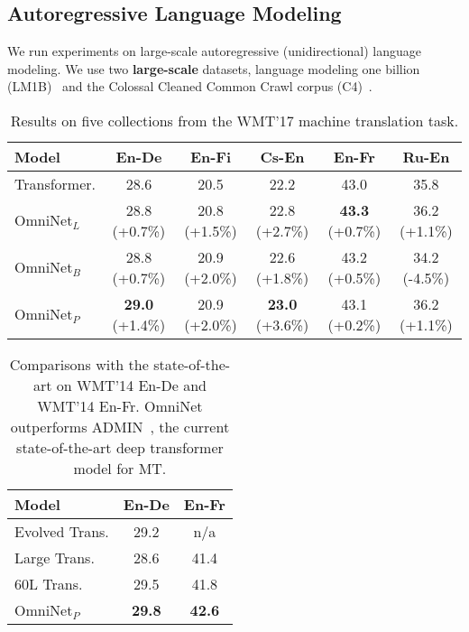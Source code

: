 \documentclass{article}
\begin{document}
\subsection{Autoregressive Language Modeling}
We run experiments on large-scale autoregressive (unidirectional) language modeling. We use two \textbf{large-scale} datasets, language modeling one billion (LM1B)~\citep{chelba2013one} and the Colossal Cleaned Common Crawl corpus (C4)~\citep{raffel2019exploring}. 

\begin{table*}[t]
    \vspace{-12pt}
    \centering
    \caption{Results on five collections from the WMT'17 machine translation task.}
    \begin{tabular}{l|ccccc}
    \toprule
    Model & En-De & En-Fi & Cs-En & En-Fr & Ru-En  \\
    \midrule
      Transformer.   & 28.6 &  20.5 & 22.2 & 43.0 & 35.8 \\
\midrule
         OmniNet$_L$  & 28.8 (+0.7\%)& 20.8 (+1.5\%) &  22.8 (+2.7\%)& \textbf{43.3} (+0.7\%) & 36.2 (+1.1\%) \\ 
         OmniNet$_B$  & 28.8 (+0.7\%) &20.9 (+2.0\%)  & 22.6 (+1.8\%) & 43.2 (+0.5\%)& 34.2 (-4.5\%)\\ 
OmniNet$_P$ &\textbf{29.0} (+1.4\%) & 20.9 (+2.0\%) & \textbf{23.0} (+3.6\%) & 43.1 (+0.2\%) &36.2 (+1.1\%) \\
         \bottomrule
    \end{tabular}
    \label{tab:wmt17}
    \vspace{-17pt}
\end{table*}

\begin{table}[t]
    \vspace{-5pt}
    \centering
    \caption{Comparisons with the state-of-the-art on WMT'14 En-De  and WMT'14 En-Fr. OmniNet outperforms ADMIN~\citep{liu2020very}, the current state-of-the-art deep transformer model for MT.}
    \begin{tabular}{l|cc}
    \toprule
    Model & En-De & En-Fr \\
    \midrule
   Evolved Trans. \citep{so2019evolved}   & 29.2 & n/a \\
      Large Trans. \citep{ott-etal-2018-scaling}  & 28.6 & 41.4  \\
      60L Trans. \citep{liu2020very} & 29.5 & 41.8\\ 
      \midrule
      OmniNet$_P$ & \textbf{29.8} & \textbf{42.6}\\ 
         \bottomrule
    \end{tabular}
    \label{tab:wmt14}
    \vspace{-22pt}
\end{table}
\end{document}
